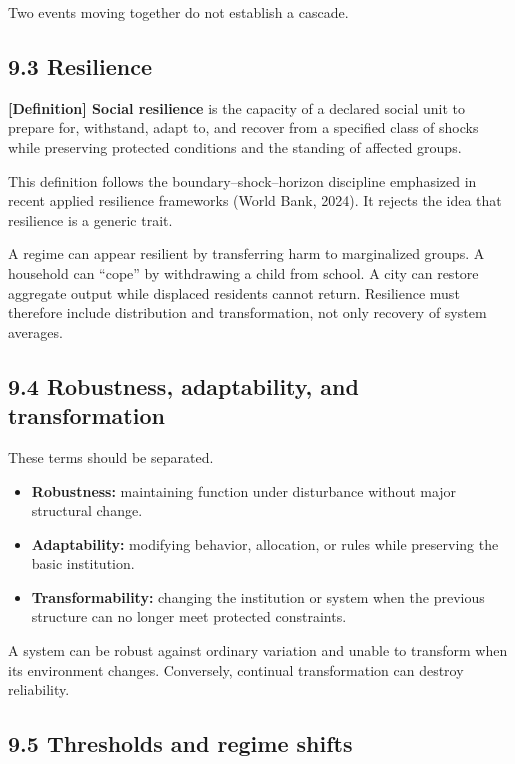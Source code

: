 \documentclass[
  11pt,
]{article}
\providecommand{\tightlist}{%
  \setlength{\itemsep}{0pt}\setlength{\parskip}{0pt}}
\begin{document}
Two events moving together do not establish a cascade.

\subsection{9.3 Resilience}\label{resilience}

\textbf{{[}Definition{]} Social resilience} is the capacity of a
declared social unit to prepare for, withstand, adapt to, and recover
from a specified class of shocks while preserving protected conditions
and the standing of affected groups.

This definition follows the boundary--shock--horizon discipline
emphasized in recent applied resilience frameworks (World Bank, 2024).
It rejects the idea that resilience is a generic trait.

A regime can appear resilient by transferring harm to marginalized
groups. A household can ``cope'' by withdrawing a child from school. A
city can restore aggregate output while displaced residents cannot
return. Resilience must therefore include distribution and
transformation, not only recovery of system averages.

\subsection{9.4 Robustness, adaptability, and
transformation}\label{robustness-adaptability-and-transformation}

These terms should be separated.

\begin{itemize}
\tightlist
\item
  \textbf{Robustness:} maintaining function under disturbance without
  major structural change.
\item
  \textbf{Adaptability:} modifying behavior, allocation, or rules while
  preserving the basic institution.
\item
  \textbf{Transformability:} changing the institution or system when the
  previous structure can no longer meet protected constraints.
\end{itemize}

A system can be robust against ordinary variation and unable to
transform when its environment changes. Conversely, continual
transformation can destroy reliability.

\subsection{9.5 Thresholds and regime
shifts}\label{thresholds-and-regime-shifts}
\end{document}
